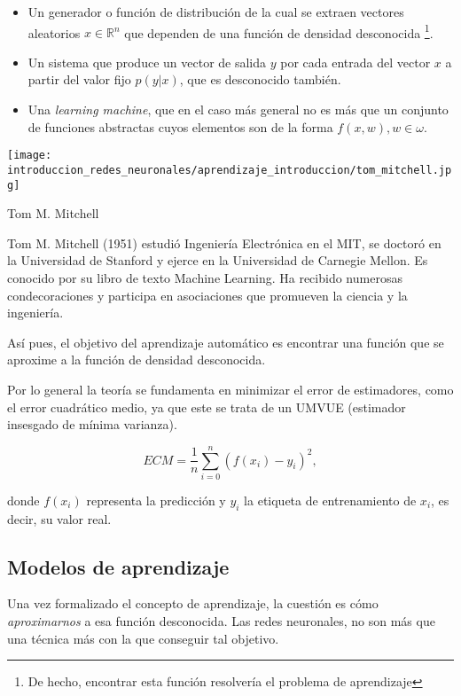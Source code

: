 \begin{itemize}
    \item Un generador o función de distribución de la cual se extraen 
    vectores aleatorios 
    $x \in \mathbb R^ n$ 
    que dependen de una función de densidad desconocida \footnote{De hecho, encontrar esta función resolvería el problema de aprendizaje}.
    
    \item Un sistema que produce un vector de salida $y$ por cada entrada del vector $x$ a partir del valor fijo $p(y|x)$, que es desconocido también. 
    
    \item Una \textit{learning machine}, que en el caso más general no es  más que un conjunto de funciones abstractas cuyos elementos son de la forma $f(x,w), w\in \omega$.
\end{itemize}

\begin{marginfigure}
    \texttt{[image: introduccion\_redes\_neuronales/aprendizaje\_introduccion/tom\_mitchell.jpg]}
   \caption{Tom M. Mitchell}
   \small
    Tom M. Mitchell
     \cite{mitchell-wikipedia} 
    (1951) estudió Ingeniería Electrónica en el MIT, 
    se doctoró en la Universidad de Stanford y ejerce en la Universidad de Carnegie Mellon. 
    Es conocido por su libro 
    de texto Machine Learning. Ha recibido numerosas condecoraciones y 
   participa en asociaciones que promueven la ciencia y la ingeniería.
\end{marginfigure}



Así pues, el objetivo del aprendizaje automático es encontrar una función que se aproxime a la función de densidad desconocida.

Por lo general la teoría se fundamenta en minimizar el error de estimadores, como el error cuadrático medio, ya que este se trata de un UMVUE  (estimador insesgado de mínima varianza). 

$$ECM = \frac{1}{n} \sum_{i=0} ^n (f(x_i) - y_i)^2,$$

donde $f(x_i)$ representa la predicción y $y_i$ la etiqueta de entrenamiento de $x_i$, es decir, su valor real. 

\subsection{Modelos de aprendizaje}  

Una vez formalizado el concepto de aprendizaje, la cuestión es cómo \textit{aproximarnos} a esa función 
desconocida. Las redes neuronales, no son más que una técnica más con la que conseguir tal objetivo. 